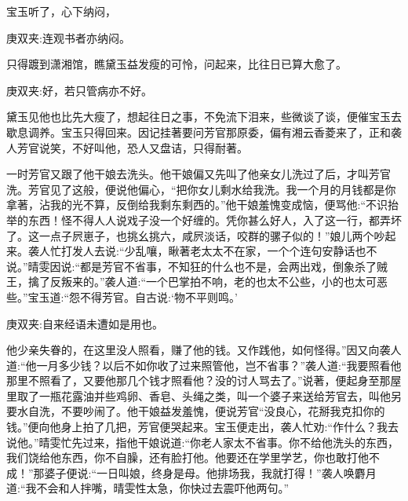 \begin{parag}
    宝玉听了，心下纳闷，\begin{note}庚双夹:连观书者亦纳闷。\end{note}只得踱到潇湘馆，瞧黛玉益发瘦的可怜，问起来，比往日已算大愈了。\begin{note}庚双夹:好，若只管病亦不好。\end{note}黛玉见他也比先大瘦了，想起往日之事，不免流下泪来，些微谈了谈，便催宝玉去歇息调养。宝玉只得回来。因记挂著要问芳官那原委，偏有湘云香菱来了，正和袭人芳官说笑，不好叫他，恐人又盘诘，只得耐著。
\end{parag}


\begin{parag}
    一时芳官又跟了他干娘去洗头。他干娘偏又先叫了他亲女儿洗过了后，才叫芳官洗。芳官见了这般，便说他偏心，“把你女儿剩水给我洗。我一个月的月钱都是你拿著，沾我的光不算，反倒给我剩东剩西的。”他干娘羞愧变成恼，便骂他:“不识抬举的东西！怪不得人人说戏子没一个好缠的。凭你甚么好人，入了这一行，都弄坏了。这一点子屄崽子，也挑幺挑六，咸屄淡话，咬群的骡子似的！”娘儿两个吵起来。袭人忙打发人去说:“少乱嚷，瞅著老太太不在家，一个个连句安静话也不说。”晴雯因说:“都是芳官不省事，不知狂的什么也不是，会两出戏，倒象杀了贼王，擒了反叛来的。”袭人道:“一个巴掌拍不响，老的也太不公些，小的也太可恶些。”宝玉道:“怨不得芳官。自古说:‘物不平则鸣。’\begin{note}庚双夹:自来经语未遭如是用也。\end{note}他少亲失眷的，在这里没人照看，赚了他的钱。又作践他，如何怪得。”因又向袭人道:“他一月多少钱？以后不如你收了过来照管他，岂不省事？”袭人道:“我要照看他那里不照看了，又要他那几个钱才照看他？没的讨人骂去了。”说著，便起身至那屋里取了一瓶花露油并些鸡卵、香皂、头绳之类，叫一个婆子来送给芳官去，叫他另要水自洗，不要吵闹了。他干娘益发羞愧，便说芳官“没良心，花掰我克扣你的钱。”便向他身上拍了几把，芳官便哭起来。宝玉便走出，袭人忙劝:“作什么？我去说他。”晴雯忙先过来，指他干娘说道:“你老人家太不省事。你不给他洗头的东西，我们饶给他东西，你不自臊，还有脸打他。他要还在学里学艺，你也敢打他不成！”那婆子便说:“一日叫娘，终身是母。他排场我，我就打得！”袭人唤麝月道:“我不会和人拌嘴，晴雯性太急，你快过去震吓他两句。” 
\end{parag}
